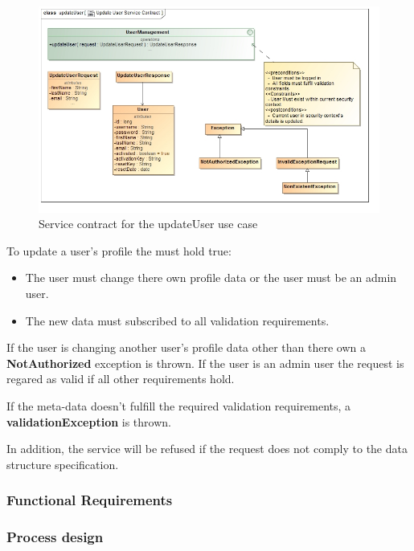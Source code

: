 \begin{figure}[H]
  \begin{center}
  \includegraphics[scale=0.55]{../Diagrams and Charts/Users/Update User Service Contract.jpg}
  \caption{Service contract for the updateUser use case}
  \label{fig:updateUserServicesContract}
  \end{center}
\end{figure}

To update a user's profile the must hold true:
\begin{itemize}
	\item The user must change there own profile data or the user must be an admin user.
	\item The new data must subscribed to all validation requirements.
\end{itemize}

If the user is changing another user's profile data other than there own a \textbf{NotAuthorized} exception is thrown.  If the user is an admin user the request is regared as valid if all other requirements hold.

If the meta-data doesn't fulfill the required validation requirements, a \textbf{validationException} is thrown.

In addition, the service will be refused if the request does not comply to the data structure specification.

\subsubsection{Functional Requirements}

\subsubsection{Process design}

